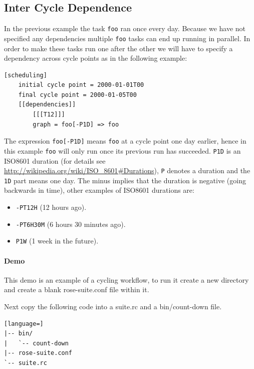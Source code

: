 \subsection{Inter Cycle Dependence}

In the previous example the task \lstinline{foo} ran once every day. Because
we have not specified any dependencies multiple \lstinline{foo} tasks can end
up running in parallel. In order to make these tasks run one after the other
we will have to specify a dependency across cycle points as in the following
example:

\begin{lstlisting}[language=suiterc]
[scheduling]
    initial cycle point = 2000-01-01T00
    final cycle point = 2000-01-05T00
    [[dependencies]]
        [[[T12]]]
        graph = foo[-P1D] => foo
\end{lstlisting}

The expression \lstinline{foo[-P1D]} means \lstinline{foo} at a cycle point
one day earlier, hence in this example \lstinline{foo} will only run once
its previous run has succeeded. \lstinline{P1D} is an ISO8601 duration (for
details see \url{http://wikipedia.org/wiki/ISO_8601#Durations}), \lstinline=P=
denotes a duration and the \lstinline=1D= part means one day. The minus implies
that the duration is negative (going backwards in time), other examples of
ISO8601 durations are:

\begin{itemize}
    \item \lstinline{-PT12H} (12 hours ago).
    \item \lstinline{-PT6H30M} (6 hours 30 minutes ago).
    \item \lstinline{P1W} (1 week in the future).
\end{itemize}

\paragraph*{Demo}
This demo is an example of a cycling workflow, to run it create a new
directory and create a blank rose-suite.conf file within it.

Next copy the following code into a suite.rc and a bin/count-down file.

\begin{lstlisting}[language=]
|-- bin/
|   `-- count-down
|-- rose-suite.conf
`-- suite.rc
\end{lstlisting}

